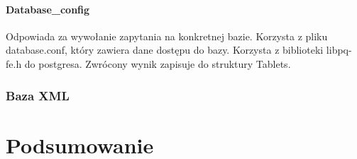 \documentclass{pracamgr}
\begin{document}



\subsubsection{Database\_config}
Odpowiada za wywołanie zapytania na konkretnej bazie. Korzysta z pliku database.conf, który zawiera dane dostępu do bazy. Korzysta z biblioteki libpq-fe.h do postgresa. Zwrócony wynik zapisuje do struktury Tablets.

\subsection{Baza XML}


\chapter{Podsumowanie}


\appendix



\begin{thebibliography}{99}


\end{thebibliography}
\end{document}
